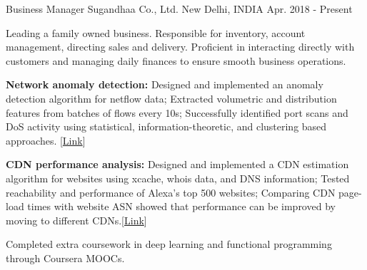 
\begin{cventries}

  \cventry
    {Business Manager} %
    {Sugandhaa Co., Ltd.} %
    {New Delhi, INDIA} %
    {Apr. 2018 - Present} %
    {
      \begin{cvitems} %
      \item {Leading a family owned business. Responsible for inventory, account management, directing sales and delivery. Proficient in interacting directly with customers and managing daily finances to ensure smooth business operations.}
    \item {\textbf{Network anomaly detection:} Designed and implemented an anomaly detection algorithm for netflow data; Extracted volumetric and distribution features from batches of flows every 10s; Successfully identified port scans and DoS activity using statistical, information-theoretic, and clustering based approaches. \hfill [\href{https://github.com/shahifaqeer/netflow-anomaly-detector}{Link}]}
    \item {\textbf{CDN performance analysis:} Designed and implemented a CDN estimation algorithm for websites using xcache, whois data, and DNS information; Tested reachability and performance of Alexa's top 500 websites; Comparing CDN page-load times with website ASN showed that performance can be improved by moving to different CDNs.\hfill [\href{https://github.com/shahifaqeer/cdn-analysis}{Link}]}
     \item {Completed extra coursework in deep learning and functional programming through Coursera MOOCs.}
      \end{cvitems}
    }


\end{cventries}
